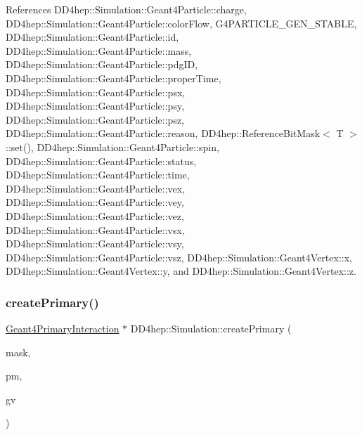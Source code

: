 References D\+D4hep\+::\+Simulation\+::\+Geant4\+Particle\+::charge, D\+D4hep\+::\+Simulation\+::\+Geant4\+Particle\+::color\+Flow, G4\+P\+A\+R\+T\+I\+C\+L\+E\+\_\+\+G\+E\+N\+\_\+\+S\+T\+A\+B\+LE, D\+D4hep\+::\+Simulation\+::\+Geant4\+Particle\+::id, D\+D4hep\+::\+Simulation\+::\+Geant4\+Particle\+::mass, D\+D4hep\+::\+Simulation\+::\+Geant4\+Particle\+::pdg\+ID, D\+D4hep\+::\+Simulation\+::\+Geant4\+Particle\+::proper\+Time, D\+D4hep\+::\+Simulation\+::\+Geant4\+Particle\+::psx, D\+D4hep\+::\+Simulation\+::\+Geant4\+Particle\+::psy, D\+D4hep\+::\+Simulation\+::\+Geant4\+Particle\+::psz, D\+D4hep\+::\+Simulation\+::\+Geant4\+Particle\+::reason, D\+D4hep\+::\+Reference\+Bit\+Mask$<$ T $>$\+::set(), D\+D4hep\+::\+Simulation\+::\+Geant4\+Particle\+::spin, D\+D4hep\+::\+Simulation\+::\+Geant4\+Particle\+::status, D\+D4hep\+::\+Simulation\+::\+Geant4\+Particle\+::time, D\+D4hep\+::\+Simulation\+::\+Geant4\+Particle\+::vex, D\+D4hep\+::\+Simulation\+::\+Geant4\+Particle\+::vey, D\+D4hep\+::\+Simulation\+::\+Geant4\+Particle\+::vez, D\+D4hep\+::\+Simulation\+::\+Geant4\+Particle\+::vsx, D\+D4hep\+::\+Simulation\+::\+Geant4\+Particle\+::vsy, D\+D4hep\+::\+Simulation\+::\+Geant4\+Particle\+::vsz, D\+D4hep\+::\+Simulation\+::\+Geant4\+Vertex\+::x, D\+D4hep\+::\+Simulation\+::\+Geant4\+Vertex\+::y, and D\+D4hep\+::\+Simulation\+::\+Geant4\+Vertex\+::z.

\hypertarget{namespace_d_d4hep_1_1_simulation_a36acd8dbd545f60bf3b6c7f06209898e}{}\label{namespace_d_d4hep_1_1_simulation_a36acd8dbd545f60bf3b6c7f06209898e} 
\subsubsection{\texorpdfstring{create\+Primary()}{createPrimary()}\hspace{0.1cm}{\footnotesize\ttfamily [3/3]}}
{\footnotesize\ttfamily \hyperlink{class_d_d4hep_1_1_simulation_1_1_geant4_primary_interaction}{Geant4\+Primary\+Interaction} $\ast$ D\+D4hep\+::\+Simulation\+::create\+Primary (\begin{DoxyParamCaption}\item[{int}]{mask,  }\item[{\hyperlink{class_d_d4hep_1_1_simulation_1_1_geant4_primary_map}{Geant4\+Primary\+Map} $\ast$}]{pm,  }\item[{const G4\+Primary\+Vertex $\ast$}]{gv }\end{DoxyParamCaption})}



